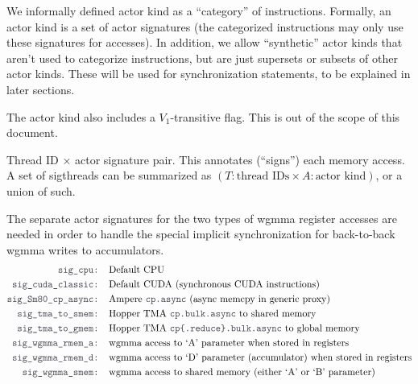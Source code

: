 \filbreak
{} We informally defined actor kind as a ``category'' of instructions.
Formally, an actor kind is a set of actor signatures (the categorized instructions may only use these signatures for accesses).
In addition, we allow ``synthetic'' actor kinds that aren't used to categorize instructions, but are just supersets or subsets of other actor kinds.
These will be used for synchronization statements, to be explained in later sections.

\filbreak
The actor kind also includes a $V_1$-transitive flag.
This is out of the scope of this document.

\filbreak
{} Thread ID $\times$ actor signature pair.
This annotates (``signs'') each memory access.
A set of sigthreads can be summarized as $(T:\text{thread IDs} \times A:\text{actor kind})$, or a union of such.

\filbreak
{} The separate actor signatures for the two types of wgmma register accesses are needed in order to handle the special implicit synchronization for back-to-back wgmma writes to accumulators.
\begin{align*}
\lighttt{sig\_cpu: } & \text{Default CPU}\\
\lighttt{sig\_cuda\_classic: } & \text{Default CUDA (synchronous CUDA instructions)}\\
\lighttt{sig\_Sm80\_cp\_async: } & \text{Ampere \lighttt{cp.async} (async memcpy in generic proxy)}\\
\lighttt{sig\_tma\_to\_smem: } & \text{Hopper TMA \lighttt{cp.bulk.async} to shared memory}\\
\lighttt{sig\_tma\_to\_gmem: } & \text{Hopper TMA \lighttt{cp\{.reduce\}.bulk.async} to global memory}\\
\lighttt{sig\_wgmma\_rmem\_a: } & \text{wgmma access to `A' parameter when stored in registers}\\
\lighttt{sig\_wgmma\_rmem\_d: } & \text{wgmma access to `D' parameter (accumulator) when stored in registers}\\
\lighttt{sig\_wgmma\_smem: } & \text{wgmma access to shared memory (either `A' or `B' parameter)}
\end{align*}

